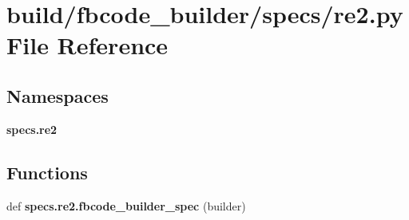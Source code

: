 \section{build/fbcode\+\_\+builder/specs/re2.py File Reference}
\label{re2_8py}
\subsection*{Namespaces}
\begin{DoxyCompactItemize}
\item 
 {\bf specs.\+re2}
\end{DoxyCompactItemize}
\subsection*{Functions}
\begin{DoxyCompactItemize}
\item 
def {\bf specs.\+re2.\+fbcode\+\_\+builder\+\_\+spec} (builder)
\end{DoxyCompactItemize}
